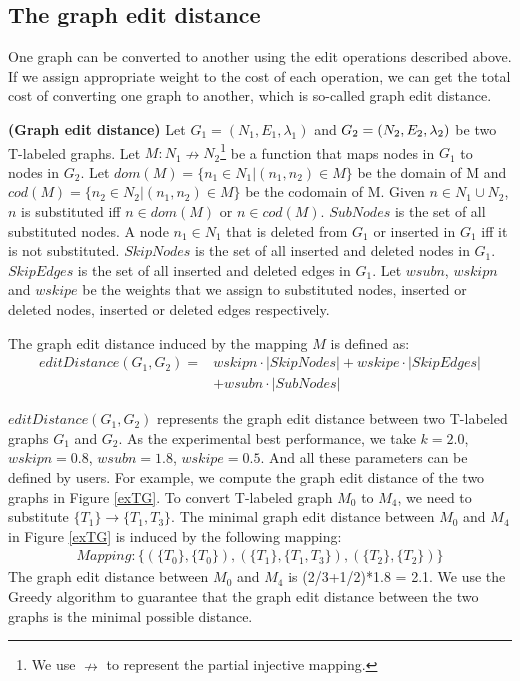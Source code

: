 \documentclass{llncs}
\begin{document}
\subsection{The graph edit distance}\label{GraphEditDistance}

One graph can be converted to another using the edit operations described above. If we assign appropriate weight to the cost of each operation, we can get the total cost of converting one graph to another, which is so-called graph edit distance.

\begin{definition}\textbf{(Graph edit distance)}
Let $G_{1}=(N_{1}, E_{1}, \lambda_{1})$ and $G_{2}=(N_{2}, E_{2},\\ \lambda_{2})$ be two T-labeled graphs. Let $M:N_{1}\nrightarrow N_{2}$\footnote{We use $\nrightarrow$ to represent the partial injective mapping.} be a function that maps nodes in $G_{1}$ to nodes in $G_{2}$. Let $dom(M)=\{n_{1} \in N_{1}|(n_{1},n_{2})\in M\}$ be the domain of M and  $cod(M)=\{n_{2} \in N_{2}|(n_{1},n_{2})\in M\}$ be the codomain of M.
Given $n \in N_{1}\cup N_{2}$, $n$ is substituted iff $n \in dom(M)$ or $n\in cod(M).$
$SubNodes$ is the set of all substituted nodes. A node $n_{1} \in N_{1}$ that is deleted from $G_{1}$ or inserted in $G_{1}$ iff it is not substituted. 
$SkipNodes$ is the set of all inserted and deleted nodes in $G_{1}$.
$SkipEdges$ is the set of all inserted and deleted edges in $G_{1}$.
Let  $wsubn$, $wskipn$ and $wskipe$ be the weights that we assign to substituted nodes, inserted or deleted nodes, inserted or deleted edges respectively.

The graph edit distance induced by the mapping $M$ is defined as:
\begin{equation*}
\begin{aligned}
editDistance(G_{1},G_{2})= & wskipn \cdot |SkipNodes|+wskipe \cdot |SkipEdges|\\
& +wsubn \cdot |SubNodes|
\end{aligned}
\end{equation*}
\end{definition}
$editDistance(G_{1},G_{2})$ represents the graph edit distance between two T-labeled graphs $G_{1}$ and $G_{2}$.
As the experimental best performance, we take $k=2.0$, $wskipn=0.8$, $wsubn=1.8$, $wskipe=0.5$. And all these parameters can be defined by users. For example, we compute the graph edit distance of the two graphs in Figure \ref{exTG}. To convert T-labeled graph $M_{0}$ to $M_{4}$, we need to substitute $\{T_{1}\} \rightarrow \{T_{1},T_{3}\}$.
The minimal graph edit distance between $M_{0}$ and $M_{4}$ in Figure \ref{exTG} is induced by the following mapping:
\begin{equation*}
\begin{aligned}
Mapping: \{(\{T_{0}\}, \{T_{0}\}),(\{T_{1}\} , \{T_{1},T_{3}\}),(\{T_{2}\} , \{T_{2}\}) \}
\end{aligned}
\end{equation*}
The graph edit distance between $M_{0}$ and $M_{4}$ is (2/3+1/2)*1.8 = 2.1.
We use the Greedy algorithm \cite{dijkman2009graph} to guarantee that the graph edit distance between the two graphs is the minimal possible distance.
\end{document}
